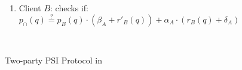\begin{figure}[ht]
\begin{center}
\begin{boxedminipage}{12.3cm}
\begin{enumerate}
\begin{enumerate}
 \item\label{checks-on-computingPSI-byB} Client $B$:  checks if:   $p_{\cap}(q)\stackrel{?}=p_{\scriptscriptstyle B}(q)\cdot(\beta_{\scriptscriptstyle A}+r'_{\scriptscriptstyle B}(q))+\alpha_{\scriptscriptstyle A}\cdot(r_{\scriptscriptstyle B}(q)+\delta_{\scriptscriptstyle A})$
 
\

\end{enumerate}
\end{enumerate}
\end{boxedminipage}
\end{center}
\caption{Two-party PSI Protocol in \cite{GhoshN19}} 
\label{fig:Two-partyPSI-Ghosh}
\end{figure}


%
%
